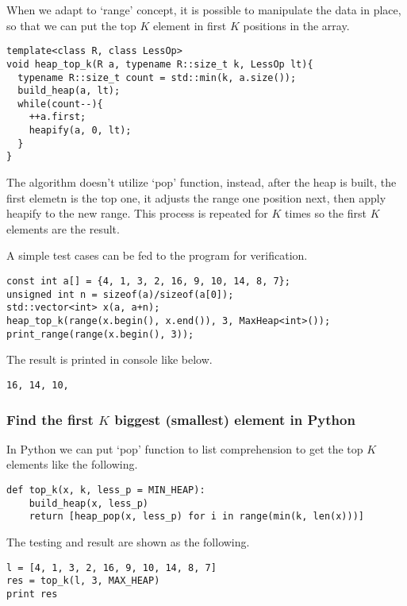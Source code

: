 \documentclass{article}
\begin{document}
When we adapt to `range' concept, it is possible to manipulate
the data in place, so that we can put the top $K$ element
in first $K$ positions in the array.

\begin{lstlisting}
template<class R, class LessOp>
void heap_top_k(R a, typename R::size_t k, LessOp lt){
  typename R::size_t count = std::min(k, a.size());
  build_heap(a, lt);
  while(count--){
    ++a.first;
    heapify(a, 0, lt);
  }
}
\end{lstlisting}

The algorithm doesn't utilize `pop' function, instead, after
the heap is built, the first elemetn is the top one, it 
adjusts the range one position next, then apply heapify
to the new range. This process is repeated for $K$ times
so the first $K$ elements are the result.

A simple test cases can be fed to the program for verification.

\begin{lstlisting}
const int a[] = {4, 1, 3, 2, 16, 9, 10, 14, 8, 7};
unsigned int n = sizeof(a)/sizeof(a[0]);
std::vector<int> x(a, a+n);
heap_top_k(range(x.begin(), x.end()), 3, MaxHeap<int>());
print_range(range(x.begin(), 3));
\end{lstlisting}

The result is printed in console like below.

\begin{verbatim}
16, 14, 10,
\end{verbatim}

\subsubsection*{Find the first $K$ biggest (smallest) element in Python}

In Python we can put `pop' function to list comprehension to
get the top $K$ elements like the following.

\lstset{language=Python}
\begin{lstlisting}
def top_k(x, k, less_p = MIN_HEAP):
    build_heap(x, less_p)
    return [heap_pop(x, less_p) for i in range(min(k, len(x)))]
\end{lstlisting}

The testing and result are shown as the following.

\begin{lstlisting}
l = [4, 1, 3, 2, 16, 9, 10, 14, 8, 7] 
res = top_k(l, 3, MAX_HEAP)
print res
\end{lstlisting}
\end{document}

